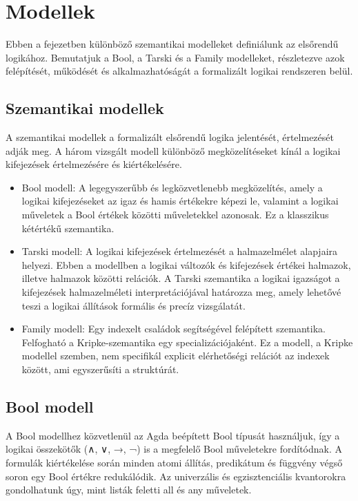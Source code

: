 \chapter{Modellek}
\label{ch:models}

Ebben a fejezetben különböző szemantikai modelleket definiálunk az elsőrendű logikához. Bemutatjuk a Bool, a Tarski és a Family modelleket, részletezve azok felépítését, működését és alkalmazhatóságát a formalizált logikai rendszeren belül.

\section{Szemantikai modellek}

A szemantikai modellek a formalizált elsőrendű logika jelentését, értelmezését adják meg. A három vizsgált modell különböző megközelítéseket kínál a logikai kifejezések értelmezésére és kiértékelésére.

\begin{itemize}
\item Bool modell: A legegyszerűbb és legközvetlenebb megközelítés, amely a logikai kifejezéseket az igaz és hamis értékekre képezi le, valamint a logikai műveletek a Bool értékek közötti műveletekkel azonosak. Ez a klasszikus kétértékű szemantika.

\item Tarski modell: A logikai kifejezések értelmezését a halmazelmélet alapjaira helyezi. Ebben a modellben a logikai változók és kifejezések értékei halmazok, illetve halmazok közötti relációk. A Tarski szemantika a logikai igazságot a kifejezések halmazelméleti interpretációjával határozza meg, amely lehetővé teszi a logikai állítások formális és precíz vizsgálatát.

\item Family modell: Egy indexelt családok segítségével felépített szemantika. Felfogható a Kripke-szemantika egy specializációjaként. Ez a modell, a Kripke modellel szemben, nem specifikál explicit elérhetőségi relációt az indexek között, ami egyszerűsíti a struktúrát.
\end{itemize}


\section{Bool modell}



A Bool modellhez közvetlenül az Agda beépített Bool típusát használjuk, így a logikai összekötők (∧, ∨, →, ¬) is a megfelelő Bool műveletekre fordítódnak. A formulák kiértékelése során minden atomi állítás, predikátum és függvény végső soron egy Bool értékre redukálódik. Az univerzális és egzisztenciális kvantorokra gondolhatunk úgy, mint listák feletti all és any műveletek.

